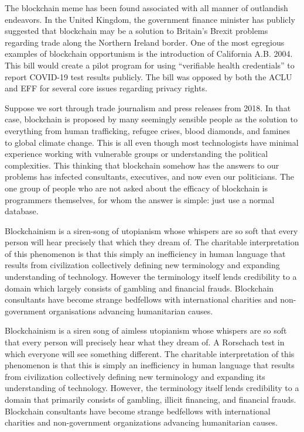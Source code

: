 The blockchain meme has been found associated with all manner of outlandish
endeavors. In the United Kingdom, the government finance minister has publicly
suggested that blockchain may be a solution to Britain's Brexit problems
regarding trade along the Northern Ireland border. One of the most egregious
examples of blockchain opportunism is the introduction of California A.B. 2004.
This bill would create a pilot program for using ``verifiable health
credentials'' to report COVID-19 test results publicly. The bill was opposed by
both the ACLU and EFF for several core issues regarding privacy rights.


Suppose we sort through trade journalism and press releases from 2018. In that
case, blockchain is proposed by many seemingly sensible people as the solution
to everything from human trafficking, refugee crises, blood diamonds, and
famines to global climate change. This is all even though most technologists
have minimal experience working with vulnerable groups or understanding the
political complexities. This thinking that blockchain somehow has the answers to
our problems has infected consultants, executives, and now even our politicians.
The one group of people who are not asked about the efficacy of blockchain is
programmers themselves, for whom the answer is simple: just use a normal
database.


Blockchainism is a siren-song of utopianism whose whispers are so soft that
every person will hear precisely that which they dream of. The charitable
interpretation of this phenomenon is that this simply an inefficiency in human
language that results from civilization collectively defining new terminology
and expanding understanding of technology. However the terminology itself lends
credibility to a domain which largely consists of gambling and financial frauds.
Blockchain consultants have become strange bedfellows with international
charities and non-government organisations advancing humanitarian causes.

Blockchainism is a siren song of aimless utopianism whose whispers are so soft
that every person will precisely hear what they dream of. A Rorschach test in
which everyone will see something different. The charitable interpretation of
this phenomenon is that this is simply an inefficiency in human language that
results from civilization collectively defining new terminology and expanding
its understanding of technology. However, the terminology itself lends
credibility to a domain that primarily consists of gambling, illicit financing,
and financial frauds. Blockchain consultants have become strange bedfellows with
international charities and non-government organizations advancing humanitarian
causes.

